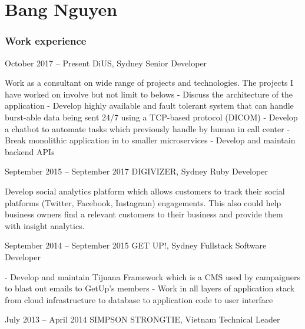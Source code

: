 \documentclass{tccv}
\begin{document}
\part{Bang Nguyen}

\section{Work experience}

\begin{eventlist}

\item{October 2017 -- Present}
    {DiUS, Sydney}
    {Senior Developer}

    Work as a consultant on wide range of projects and technologies. The projects
    I have worked on involve but not limit to belows
    \newline- Discuss the architecture of the application
    \newline- Develop highly available and fault tolerant system that can handle
    burst-able data being sent 24/7 using a TCP-based protocol (DICOM)
    \newline- Develop a chatbot to automate tasks which previously handle by
    human in call center
    \newline- Break monolithic application in to smaller microservices
    \newline- Develop and maintain backend APIs

\item{September 2015 -- September 2017}
    {DIGIVIZER, Sydney}
    {Ruby Developer}

    Develop social analytics platform which allows customers to track their
    social platforms (Twitter, Facebook, Instagram) engagements.
    This also could help business owners find a relevant customers
    to their business and provide them with insight analytics.

\item{September 2014 -- September 2015}
    {GET UP!, Sydney}
    {Fullstack Software Developer}

    - Develop and maintain Tijuana Framework which is a CMS
    used by campaigners to blast out emails to GetUp's members
    \newline - Work in all layers of application stack from cloud infrastructure
    to database to application code to user interface

\item{July 2013 -- April 2014}
    {SIMPSON STRONGTIE, Vietnam}
    {Technical Leader}


\end{eventlist}
\end{document}
